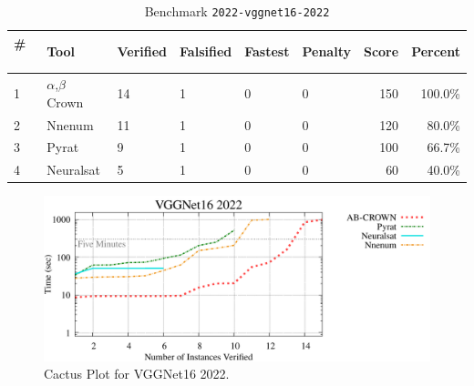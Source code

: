 \begin{table}[h]
\begin{center}
\caption{Benchmark \texttt{2022-vggnet16-2022}} \label{tab:cat_{cat}}
{\setlength{\tabcolsep}{2pt}
\begin{tabular}[h]{@{}llllllrr@{}}
\toprule
\textbf{\# ~} & \textbf{Tool} & \textbf{Verified} & \textbf{Falsified} & \textbf{Fastest} & \textbf{Penalty} & \textbf{Score} & \textbf{Percent}\\
\midrule
1 & $\alpha$,$\beta$ Crown & 14 & 1 & 0 & 0 & 150 & 100.0\% \\
2 & Nnenum & 11 & 1 & 0 & 0 & 120 & 80.0\% \\
3 & Pyrat & 9 & 1 & 0 & 0 & 100 & 66.7\% \\
4 & Neuralsat & 5 & 1 & 0 & 0 & 60 & 40.0\% \\
\bottomrule
\end{tabular}
}
\end{center}
\end{table}



\begin{figure}[h]
\centerline{\includegraphics[width=\textwidth]{cactus/2022_vggnet16_2022.pdf}}
\caption{Cactus Plot for VGGNet16 2022.}
\label{fig:quantPic}
\end{figure}

